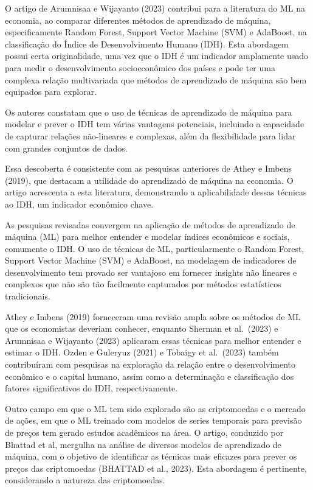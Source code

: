 \documentclass[
]{article}
\begin{document}
O artigo de Arumnisaa e Wijayanto (2023) contribui para a literatura do
ML na economia, ao comparar diferentes métodos de aprendizado de
máquina, especificamente Random Forest, Support Vector Machine (SVM) e
AdaBoost, na classificação do Índice de Desenvolvimento Humano (IDH).
Esta abordagem possui certa originalidade, uma vez que o IDH é um
indicador amplamente usado para medir o desenvolvimento socioeconômico
dos países e pode ter uma complexa relação multivariada que métodos de
aprendizado de máquina são bem equipados para explorar.

Os autores constatam que o uso de técnicas de aprendizado de máquina
para modelar e prever o IDH tem várias vantagens potenciais, incluindo a
capacidade de capturar relações não-lineares e complexas, além da
flexibilidade para lidar com grandes conjuntos de dados.

Essa descoberta é consistente com as pesquisas anteriores de Athey e
Imbens (2019), que destacam a utilidade do aprendizado de máquina na
economia. O artigo acrescenta a esta literatura, demonstrando a
aplicabilidade dessas técnicas ao IDH, um indicador econômico chave.

As pesquisas revisadas convergem na aplicação de métodos de aprendizado
de máquina (ML) para melhor entender e modelar índices econômicos e
sociais, comumente o IDH. O uso de técnicas de ML, particularmente o
Random Forest, Support Vector Machine (SVM) e AdaBoost, na modelagem de
indicadores de desenvolvimento tem provado ser vantajoso em fornecer
insights não lineares e complexos que não são tão facilmente capturados
por métodos estatísticos tradicionais.

Athey e Imbens (2019) forneceram uma revisão ampla sobre os métodos de
ML que os economistas deveriam conhecer, enquanto Sherman et al.~(2023)
e Arumnisaa e Wijayanto (2023) aplicaram essas técnicas para melhor
entender e estimar o IDH. Ozden e Guleryuz (2021) e Tobaigy et
al.~(2023) também contribuíram com pesquisas na exploração da relação
entre o desenvolvimento econômico e o capital humano, assim como a
determinação e classificação dos fatores significativos do IDH,
respectivamente.

Outro campo em que o ML tem sido explorado são as criptomoedas e o
mercado de ações, em que o ML treinado com modelos de series temporais
para previsão de preços tem gerado estudos acadêmicos na área. O artigo,
conduzido por Bhattad et al, mergulha na análise de diversos modelos de
aprendizado de máquina, com o objetivo de identificar as técnicas mais
eficazes para prever os preços das criptomoedas (BHATTAD et al., 2023).
Esta abordagem é pertinente, considerando a natureza das criptomoedas.
\end{document}
